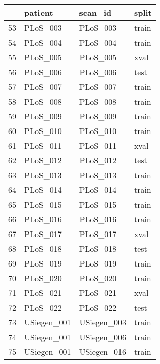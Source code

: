 \begin{SCtable}[\sidecaptionrelwidth][h]
\begin{tabular}{l m{4cm} m{4cm} l}
    \toprule
    {} &           patient &           scan\_id &  split \\
    \midrule

    53  &          PLoS\_003 &          PLoS\_003 &  train \\
    54  &          PLoS\_004 &          PLoS\_004 &  train \\
    55  &          PLoS\_005 &          PLoS\_005 &   xval \\
    56  &          PLoS\_006 &          PLoS\_006 &   test \\
    57  &          PLoS\_007 &          PLoS\_007 &  train \\
    58  &          PLoS\_008 &          PLoS\_008 &  train \\
    59  &          PLoS\_009 &          PLoS\_009 &  train \\
    60  &          PLoS\_010 &          PLoS\_010 &  train \\
    61  &          PLoS\_011 &          PLoS\_011 &   xval \\
    62  &          PLoS\_012 &          PLoS\_012 &   test \\
    63  &          PLoS\_013 &          PLoS\_013 &  train \\
    64  &          PLoS\_014 &          PLoS\_014 &  train \\
    65  &          PLoS\_015 &          PLoS\_015 &  train \\
    66  &          PLoS\_016 &          PLoS\_016 &  train \\
    67  &          PLoS\_017 &          PLoS\_017 &   xval \\
    68  &          PLoS\_018 &          PLoS\_018 &   test \\
    69  &          PLoS\_019 &          PLoS\_019 &  train \\
    70  &          PLoS\_020 &          PLoS\_020 &  train \\
    71  &          PLoS\_021 &          PLoS\_021 &   xval \\
    72  &          PLoS\_022 &          PLoS\_022 &   test \\
    73  &       USiegen\_001 &       USiegen\_003 &  train \\
    74  &       USiegen\_001 &       USiegen\_006 &  train \\
    75  &       USiegen\_001 &       USiegen\_016 &  train \\

\end{tabular}
\end{SCtable}
